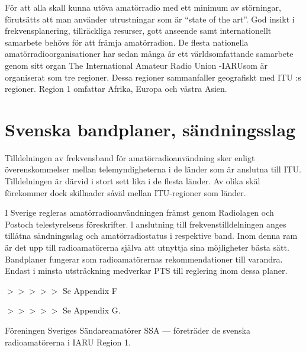 För att alla skall kunna utöva amatörradio med ett minimum av störningar,
förutsätts att man använder utrustningar som är ``state of the art''.  God
insikt i frekvensplanering, tillräckliga resurser, gott anseende samt
internationellt samarbete behövs för att främja amatörradion. De flesta
nationella amatörradioorganisationer har sedan många år ett världsomfattande
samarbete genom sitt organ The International Amateur Radio Union -IARUsom är
organiserat som tre regioner. Dessa regioner sammanfaller geografiskt med ITU :s
regioner. Region 1 omfattar Afrika, Europa och västra Asien.

\section{Svenska bandplaner, sändningsslag}

Tilldelningen av frekvensband för amatörradioanvändning sker enligt
överenskommelser mellan telemyndigheterna i de länder som är anslutna till
ITU. Tilldelningen är därvid i stort sett lika i de flesta länder. Av olika skäl
förekommer dock skillnader såväl mellan ITU-regioner som länder.

I Sverige regleras amatörradioanvändningen främst genom Radiolagen och Postoch
telestyrelsens föreskrifter. l anslutning till frekvenstilldelningen anges
tillåtna sändningsslag och amatörradiostatus i respektive band. Inom denna ram
är det upp till radioamatörerna själva att utnyttja sina möjligheter bästa sätt.
Bandplaner fungerar som radioamatörernas rekommendationer till varandra. Endast
i minsta utsträckning medverkar PTS till reglering inom dessa planer.

$>>>>>$ Se Appendix F

$>>>>>$ Se Appendix G.

Föreningen Sveriges Sändareamatörer SSA --- företräder de svenska
radioamatörerna i IARU Region 1.

